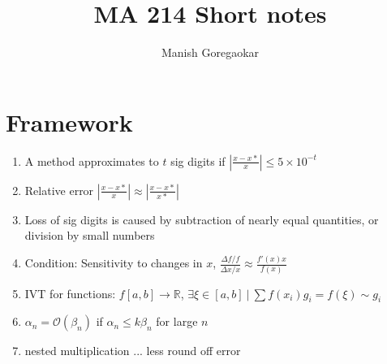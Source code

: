 \documentclass[12pt]{article}
\title{MA 214 Short notes}
\author{Manish Goregaokar}
\begin{document}
\maketitle
\section{Framework}
\begin{enumerate}
\item A method approximates to $t$ sig digits if $\left|\frac{x-x*}{x}\right|\leq 5\times 10^{-t}$
\item Relative error $\left|\frac{x-x*}{x}\right|\approx \left|\frac{x-x*}{x*}\right|$
\item Loss of sig digits is caused by subtraction of nearly equal quantities, or division by small numbers
\item Condition: Sensitivity to changes in $x$, $\frac{\Delta f/f}{\Delta x /x}\approx \frac{f'(x)x}{f(x)}$
\item IVT for functions: $f[a,b]\to\mathbb R$, $\exists \xi\in[a,b] ~|~\sum f(x_i)g_i=f(\xi)\sim g_i$
\item $\alpha_n =\mathcal O(\beta_n)$ if $\alpha_n\leq k\beta_n$ for large $n$
\item nested multiplication ... less round off error

\end{enumerate}
\end{document}
